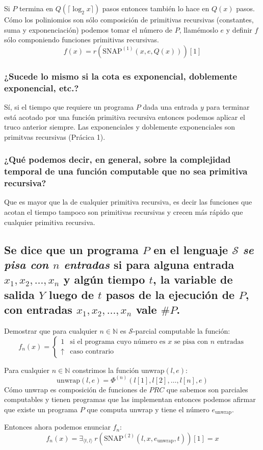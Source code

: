 \documentclass[fleqn, 11pt]{article}
\newcommand{\nat}{\mathbb{N}}
\newcommand{\Scur}{\mathcal{S}}
\newcommand{\indef}{\uparrow}
\newcommand{\SNAP}[1][n]{\text{SNAP}^{(#1)}}
\begin{document}
Si $P$ termina en $Q(\lceil \log_2 x \rceil)$ pasos entonces también lo hace en
$Q(x)$ pasos. Cómo los poliniomios son sólo composición de primitivas
recursivas (constantes, suma y exponenciación) podemos tomar el número de $P$,
llamémoslo $e$ y definir $f$ sólo componiendo funciones primitivas recursivas.
\[
	f(x) = r(\SNAP[1](x, e, Q(x)))[1]
\]

\subsubsection{¿Sucede lo mismo si la cota es exponencial, doblemente
exponencial, etc.?}

Sí, si el tiempo que requiere un programa $P$ dada una entrada $y$ para
terminar está acotado por una función primitiva recursiva entonces podemos
aplicar el truco anterior siempre. Las exponenciales y doblemente exponenciales
son primitvas recursivas (Prácica 1).

\subsubsection{¿Qué podemos decir, en general, sobre la complejidad temporal de
una función computable que no sea primitiva recursiva?}

Que es mayor que la de cualquier primitiva recursiva, es decir las funciones
que acotan el tiempo tampoco son primitivas recursivas y crecen más rápido que
cualquier primitiva recursiva.

\subsection{Se dice que un programa $P$ en el lenguaje $\Scur$ \emph{se pisa
con $n$ entradas} si para alguna entrada $x_1, x_2, \dots, x_n$ y algún tiempo
$t$, la variable de salida $Y$ luego de $t$ pasos de la ejecución de $P$, con
entradas $x_1, x_2, \dots, x_n$ vale $\#P$.}

Demostrar que para cualquier $n \in \nat$ es $\Scur$-parcial computable la
función:
\[
	f_n(x) =
	\begin{cases}
		1      & \text{si el programa cuyo número es $x$ se pisa con
		         $n$ entradas} \\
		\indef & \text{caso contrario}
	\end{cases}
\]

Para cualquier $n \in \nat$ constrimos la función unwrap$(l, e)$:
\[
	\text{unwrap}(l, e) = \Phi^{(n)}(l[1], l[2], \dots, l[n], e)
\]
Cómo unwrap es composición de funciones de $PRC$ que sabemos son parciales
computables y tienen programas que las implementan entonces podemos afirmar que
existe un programa $P$ que computa unwrap y tiene el número
$e_{\text{unwrap}}$.

Entonces ahora podemos enunciar $f_n$:
\[
	f_n(x) = \exists_{\langle t, l \rangle}\ r(\SNAP[2](l, x,
		e_{\text{unwrap}}, t))[1] = x
\]
\end{document}
